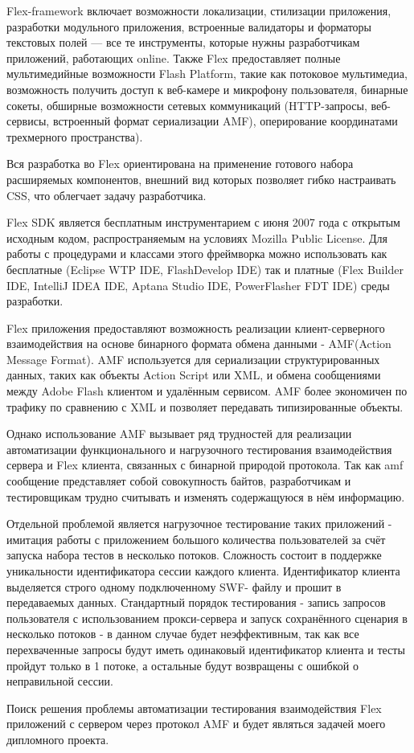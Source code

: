 Flex-framework включает возможности локализации, стилизации приложения, разработки модульного приложения, 
встроенные валидаторы и форматоры текстовых полей — все те инструменты, которые нужны разработчикам 
приложений, работающих online. Также Flex предоставляет полные мультимедийные возможности Flash 
Platform, такие как потоковое мультимедиа,  возможность получить доступ к веб-камере и микрофону 
пользователя, бинарные сокеты, обширные возможности сетевых коммуникаций (HTTP-запросы, веб-сервисы, 
встроенный формат сериализации AMF), оперирование координатами трехмерного пространства).

Вся разработка во Flex  ориентирована на применение готового набора
расширяемых компонентов,  внешний вид которых позволяет гибко
настраивать CSS, что облегчает задачу разработчика. 

Flex SDK  является бесплатным инструментарием с июня 2007 
года с открытым исходным кодом,  распространяемым на условиях Mozilla Public License.  
Для работы с процедурами и классами этого фреймворка можно использовать как бесплатные 
(Eclipse WTP IDE, FlashDevelop IDE) так и платные (Flex Builder IDE, IntelliJ IDEA IDE, 
Aptana Studio IDE, PowerFlasher FDT IDE) среды разработки.

Flex приложения предоставляют возможность реализации клиент-серверного взаимодействия 
на основе бинарного формата обмена данными - AMF(Action Message Format). AMF 
используется для сериализации структурированных данных, таких как объекты Action Script 
или XML, и обмена сообщениями между Adobe Flash клиентом и удалённым сервисом. 
AMF более экономичен по трафику по сравнению с XML и позволяет передавать типизированные объекты.

Однако использование AMF вызывает ряд трудностей для реализации автоматизации функционального 
и нагрузочного тестирования взаимодействия сервера и Flex клиента, связанных с бинарной 
природой протокола. Так как amf сообщение представляет собой совокупность байтов, 
разработчикам и тестировщикам трудно считывать и изменять содержащуюся в нём информацию.

Отдельной проблемой является нагрузочное тестирование таких приложений - имитация работы с 
приложением большого количества пользователей за счёт запуска набора тестов в несколько потоков. 
Сложность состоит в поддержке уникальности идентификатора сессии каждого клиента. Идентификатор 
клиента выделяется строго одному подключенному SWF- файлу и прошит в передаваемых данных. 
Стандартный порядок тестирования - запись запросов пользователя с использованием прокси-сервера 
и запуск сохранённого сценария в несколько потоков - в данном случае будет неэффективным, так 
как  все перехваченные запросы будут иметь одинаковый идентификатор клиента и тесты пройдут 
только в 1 потоке, а остальные будут возвращены с ошибкой о неправильной сессии.
 
Поиск решения проблемы автоматизации тестирования взаимодействия Flex приложений с сервером 
через протокол AMF и будет являться задачей моего дипломного проекта.
